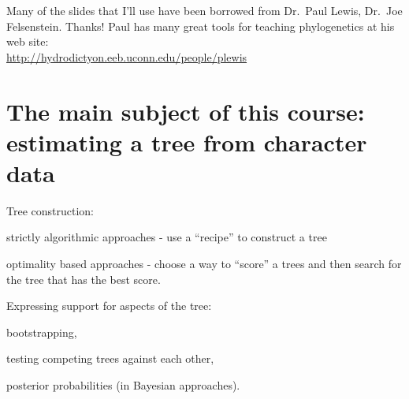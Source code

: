 \documentclass[landscape]{foils}
\begin{document}
\pagecolor{white}
\unitlength=1mm
\begin{center}
{\Large Many of the  slides that I'll use have been borrowed from Dr.\ Paul Lewis, Dr.\ Joe Felsenstein. Thanks!}
\vskip 15mm
\large Paul has many great tools for teaching phylogenetics at his web site: \\
\url{http://hydrodictyon.eeb.uconn.edu/people/plewis}
\end{center}

\myNewSlide
\myNewSlide
\section*{The main subject of this course: estimating a tree from character data}
Tree construction:
\begin{compactitem}
	\item strictly algorithmic approaches - use a ``recipe'' to construct a tree
	\item optimality based approaches - choose a way to ``score'' a trees and then search for the tree that has the best score.
\end{compactitem}
Expressing support for aspects of the tree:
\begin{compactitem}
	\item bootstrapping,
	\item testing competing trees against each other,
	\item posterior probabilities (in Bayesian approaches).
\end{compactitem}
\end{document}
